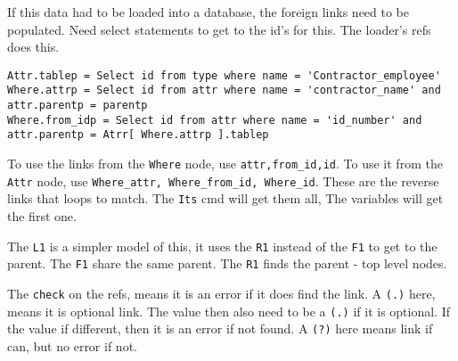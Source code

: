 If this data had to be loaded into a database, the foreign links need to
be populated. Need select statements to get to the id's for this. The
loader's refs does this.

\begin{verbatim}
Attr.tablep = Select id from type where name = 'Contractor_employee'
Where.attrp = Select id from attr where name = 'contractor_name' and attr.parentp = parentp
Where.from_idp = Select id from attr where name = 'id_number' and attr.parentp = Atrr[ Where.attrp ].tablep
\end{verbatim}

To use the links from the \texttt{Where} node, use
\texttt{attr,from\_id,id}. To use it from the \texttt{Attr} node, use
\texttt{Where\_attr,\ Where\_from\_id,\ Where\_id}. These are the
reverse links that loops to match. The \texttt{Its} cmd will get them
all, The variables will get the first one.

The \texttt{L1} is a simpler model of this, it uses the \texttt{R1}
instead of the \texttt{F1} to get to the parent. The \texttt{F1} share
the same parent. The \texttt{R1} finds the parent - top level nodes.

The \texttt{check} on the refs, means it is an error if it does find the
link. A \texttt{(.)} here, means it is optional link. The value then
also need to be a \texttt{(.)} if it is optional. If the value if
different, then it is an error if not found. A \texttt{(?)} here means
link if can, but no error if not.
